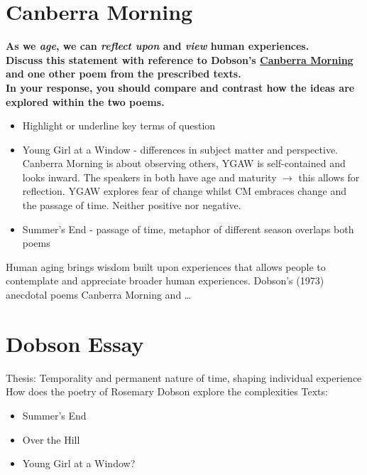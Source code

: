 \section{Canberra Morning} \label{28/11/2024}
	\textbf{As we \textit{age}, we can \textit{reflect upon} and \textit{view} human experiences. \\
	Discuss this statement with reference to Dobson's \underline{Canberra Morning} and one other poem from the prescribed texts. \\
	In your response, you should compare and contrast how the ideas are explored within the two poems.}

	\begin{itemize}
		\item Highlight or underline key terms of question
		\item Young Girl at a Window - differences in subject matter and perspective. Canberra Morning is about observing others, YGAW is self-contained and looks inward. The speakers in both have age and maturity $\rightarrow$ this allows for reflection. YGAW explores fear of change whilst CM embraces change and the passage of time. Neither positive nor negative.
	\item Summer's End - passage of time, metaphor of different season overlaps both poems
	\end{itemize}

	Human aging brings wisdom built upon experiences that allows people to contemplate and appreciate broader human experiences. Dobson's (1973) anecdotal poems Canberra Morning and \dots

\section{Dobson Essay} \label{13/12/2024}
	Thesis: Temporality and permanent nature of time, shaping individual experience
	How does the poetry of Rosemary Dobson explore the complexities
	Texts:
	\begin{itemize}
		\item Summer's End
		\item Over the Hill
		\item Young Girl at a Window?
	\end{itemize}
	
